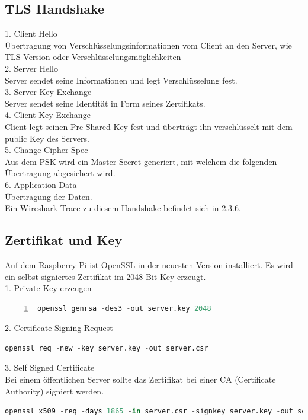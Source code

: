 \subsection{TLS Handshake}
1. Client Hello\\
Übertragung von Verschlüsselungsinformationen vom Client an den Server, wie TLS Version oder Verschlüsselungsmöglichkeiten\\
2. Server Hello \\
Server sendet seine Informationen und legt Verschlüsselung fest. \\
3. Server Key Exchange\\
Server sendet seine Identität in Form seines Zertifikats. \\
4. Client Key Exchange\\
Client legt seinen Pre-Shared-Key fest und überträgt ihn verschlüsselt mit dem public Key des Servers.\\
5. Change Cipher Spec\\
Aus dem PSK wird ein Master-Secret generiert, mit welchem die folgenden Übertragung abgesichert wird. \\
6. Application Data\\
Übertragung der Daten. \\
Ein Wireshark Trace zu diesem Handshake befindet sich in 2.3.6.\\
\subsection{Zertifikat und Key}
Auf dem Raspberry Pi ist OpenSSL in der neuesten Version installiert. Es wird ein selbst-signiertes Zertifikat im 2048 Bit Key erzeugt.\\
1. Private Key erzeugen
\begin{lstlisting}[caption =private Key, language=python, frame=single, breaklines=true,columns=fullflexible, commentstyle=\color{gray}\upshape, captionpos=b, numbers = left]
openssl genrsa -des3 -out server.key 2048
\end{lstlisting}

2. Certificate Signing Request
\begin{lstlisting}[caption =Certificate Signing Request, language=python, frame=single, breaklines=true,columns=fullflexible, commentstyle=\color{gray}\upshape, captionpos=b]
openssl req -new -key server.key -out server.csr
\end{lstlisting}

3. Self Signed Certificate\\
Bei einem öffentlichen Server sollte das Zertifikat bei einer CA (Certificate Authority) signiert werden. \\
\begin{lstlisting}[caption =Self Signed Certificate, language=python, frame=single, breaklines=true,columns=fullflexible, commentstyle=\color{gray}\upshape, captionpos=b]
openssl x509 -req -days 1865 -in server.csr -signkey server.key -out server.crt
\end{lstlisting}

